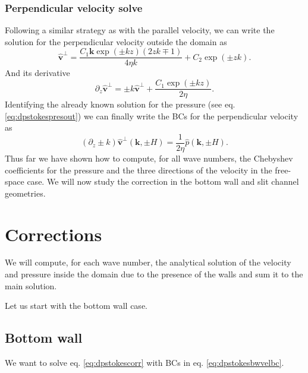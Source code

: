 \documentclass[ twoside,openright,titlepage,numbers=noenddot,%
headinclude,footinclude,cleardoublepage=empty,abstract=on,
BCOR=5mm,paper=a4,fontsize=11pt, dvipsnames
]{scrreprt}
\renewcommand{\vec}[1]{\bm{#1}}
\newcommand{\fou}[1]{\widehat{#1}}
\newcommand{\fvel}{v}
\begin{document}
\subsubsection*{Perpendicular velocity solve}
Following a similar strategy as with the parallel velocity, we can write the solution for the perpendicular velocity outside the domain as
\begin{equation}
    \label{eq:dpstokesperpvel}
  \fou{\vec{\fvel}}^{\perp} = \frac{C_1\vec{k}\exp(\pm kz)\left(2zk\mp 1\right)}{4\eta k} + C_2\exp(\pm zk).
\end{equation}
And its derivative
\begin{equation}
  \label{eq:dpstokesperpvelder}
  \partial_z\fou{\vec{\fvel}}^{\perp} = \pm k\fou{\vec{\fvel}}^{\perp} + \frac{C_1\exp(\pm kz)}{2\eta}.
\end{equation}
Identifying the already known solution for the pressure (see eq. \eqref{eq:dpstokespresout}) we can finally write the \glspl{BC} for the perpendicular velocity as
\begin{equation}
  \label{eq:dpstokesperpvelbc}
  \left(\partial_z\pm k\right)\fou{\vec{\fvel}}^\perp(\vec{k}, \pm H) = \frac{1}{2\eta}\fou{p}(\vec{k}, \pm H).
\end{equation}
Thus far we have shown how to compute, for all wave numbers, the Chebyshev coefficients for the pressure and the three directions of the velocity in the free-space case. We will now study the correction in the bottom wall and slit channel geometries.
\section{Corrections}
We will compute, for each wave number, the analytical solution of the velocity and pressure inside the domain due to the presence of the walls and sum it to the main solution.

Let us start with the bottom wall case.
\subsection*{Bottom wall}

We want to solve eq. \eqref{eq:dpstokescorr} with \glspl{BC} in eq. \eqref{eq:dpstokesbwvelbc}.
\end{document}

